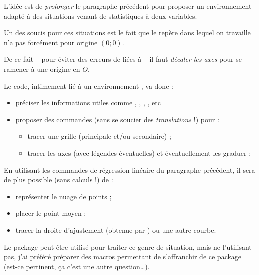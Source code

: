 \begin{tipblock}
L'idée est de \textit{prolonger} le paragraphe précédent pour proposer un environnement \TikZ{} adapté à des situations venant de statistiques à deux variables.

\smallskip

Un des soucis pour ces situations est le fait que le repère dans lequel on travaille n'a pas forcément pour origine $(0;0)$.

De ce fait -- pour éviter des erreurs de  liées à \TikZ{} -- il faut \textit{décaler les axes} pour se ramener à une origine en $O$.

\smallskip

Le code, intimement lié à un environnement , va donc :

\begin{itemize}
\item préciser les informations utiles comme , , , , etc
\item proposer des commandes (sans se soucier des \textit{translations} !) pour :
\begin{itemize}
		\item tracer une grille (principale et/ou secondaire) ;
		\item tracer les axes (avec légendes éventuelles) et éventuellement les graduer ;
	\end{itemize}
\end{itemize}

En utilisant les commandes de \textsf{régression linéaire} du paragraphe précédent, il sera de plus possible (sans calculs !) de :

\begin{itemize}
\item représenter le nuage de points ;
\item placer le point moyen ;
\item tracer la droite d'ajustement (obtenue par ) ou une autre courbe.
\end{itemize}
\vspace*{-\baselineskip}\leavevmode
\end{tipblock}

\begin{noteblock}
Le package  peut être utilisé pour traiter ce genre de situation, mais ne l'utilisant pas, j'ai préféré préparer des \textsf{macros} permettant de s'affranchir de ce package (est-ce pertinent, ça c'est une autre question\ldots).
\end{noteblock}

